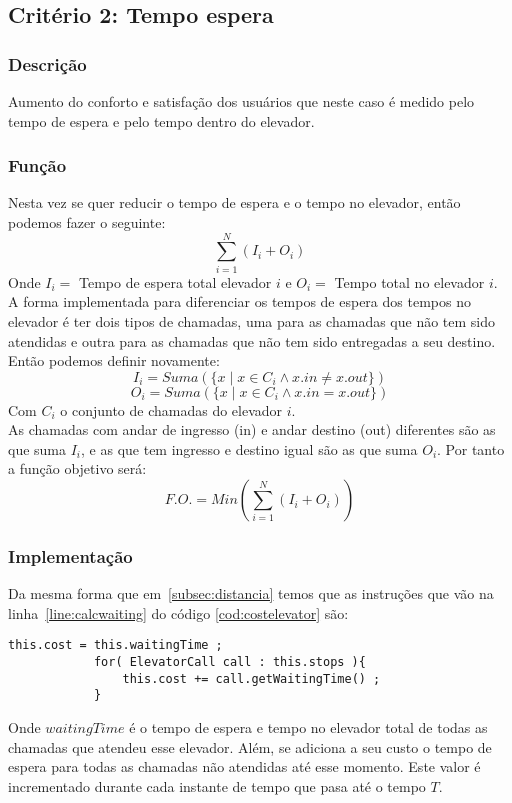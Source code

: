  \subsection{Critério 2: Tempo espera}
 	\label{subsec:wait}
	\subsubsection{Descrição}
		Aumento do conforto e satisfação dos usuários que neste caso é medido pelo tempo de espera e pelo tempo dentro do elevador.
	\subsubsection{Função}
		Nesta vez se quer reducir o tempo de espera e o tempo no elevador, então podemos fazer o seguinte:
		\[
			\sum_{i=1}^{N} ( I_i + O_i )
		\]
		Onde $I_i = $ Tempo de espera total elevador $i$ e $O_i = $ Tempo total no elevador $i$.
		A forma implementada para diferenciar os tempos de espera dos tempos no elevador é ter dois tipos de chamadas, uma para as chamadas que não tem sido atendidas e outra para as chamadas que não tem sido entregadas a seu destino.
		Então podemos definir novamente:
		\[
			I_i = Suma( \{ x \mid x \in C_i \land x.in \neq x.out \} )
		\]
		\[
			O_i = Suma( \{ x \mid x \in C_i \land x.in = x.out \} )
		\]
		Com $C_i$ o conjunto de chamadas do elevador $i$. \\
		As chamadas com andar de ingresso (in) e andar destino (out) diferentes são as que suma $I_i$, e as que tem ingresso e destino igual são as que suma $O_i$.
		Por tanto a função objetivo será:
		\[
			F.O. = Min( \sum_{i=1}^{N} ( I_i + O_i ) )
		\]
	\subsubsection{Implementação}
		Da mesma forma que em~\ref{subsec:distancia} temos que as instruções que vão na linha~\ref{line:calcwaiting} do código \ref{cod:costelevator} são:
		\begin{lstlisting}[caption = Calculo de custo por tempo de espera do elevador, label = cod:calcwaiting]
			this.cost = this.waitingTime ;
			for( ElevatorCall call : this.stops ){
				this.cost += call.getWaitingTime() ;
			}
		\end{lstlisting}
		Onde ${waitingTime}$ é o tempo de espera e tempo no elevador total de todas as chamadas que atendeu esse elevador. Além, se adiciona a seu custo o tempo de espera para todas as chamadas não atendidas até esse momento. Este valor é incrementado durante cada instante de tempo que pasa até o tempo $T$.
		
